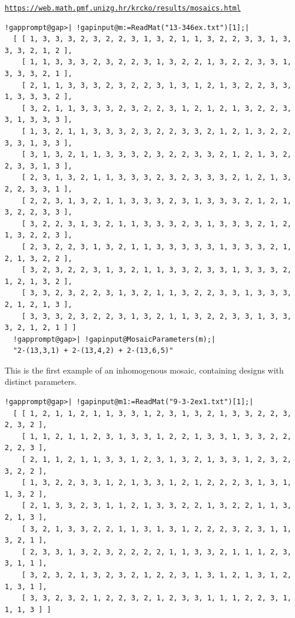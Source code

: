 \documentclass[a4paper,11pt]{report}
\begin{document}
{{ \href{https://web.math.pmf.unizg.hr/~krcko/results/mosaics.html} {\texttt{https://web.math.pmf.unizg.hr/\texttt{}krcko/results/mosaics.html}} 
\begin{Verbatim}[commandchars=!@|,fontsize=\small,frame=single,label=Example]
  !gapprompt@gap>| !gapinput@m:=ReadMat("13-346ex.txt")[1];|
  [ [ 1, 3, 3, 3, 2, 3, 2, 2, 3, 1, 3, 2, 1, 1, 3, 2, 2, 3, 3, 1, 3, 3, 3, 2, 1, 2 ], 
    [ 1, 1, 3, 3, 3, 2, 3, 2, 2, 3, 1, 3, 2, 2, 1, 3, 2, 2, 3, 3, 1, 3, 3, 3, 2, 1 ], 
    [ 2, 1, 1, 3, 3, 3, 2, 3, 2, 2, 3, 1, 3, 1, 2, 1, 3, 2, 2, 3, 3, 1, 3, 3, 3, 2 ], 
    [ 3, 2, 1, 1, 3, 3, 3, 2, 3, 2, 2, 3, 1, 2, 1, 2, 1, 3, 2, 2, 3, 3, 1, 3, 3, 3 ], 
    [ 1, 3, 2, 1, 1, 3, 3, 3, 2, 3, 2, 2, 3, 3, 2, 1, 2, 1, 3, 2, 2, 3, 3, 1, 3, 3 ], 
    [ 3, 1, 3, 2, 1, 1, 3, 3, 3, 2, 3, 2, 2, 3, 3, 2, 1, 2, 1, 3, 2, 2, 3, 3, 1, 3 ], 
    [ 2, 3, 1, 3, 2, 1, 1, 3, 3, 3, 2, 3, 2, 3, 3, 3, 2, 1, 2, 1, 3, 2, 2, 3, 3, 1 ], 
    [ 2, 2, 3, 1, 3, 2, 1, 1, 3, 3, 3, 2, 3, 1, 3, 3, 3, 2, 1, 2, 1, 3, 2, 2, 3, 3 ], 
    [ 3, 2, 2, 3, 1, 3, 2, 1, 1, 3, 3, 3, 2, 3, 1, 3, 3, 3, 2, 1, 2, 1, 3, 2, 2, 3 ], 
    [ 2, 3, 2, 2, 3, 1, 3, 2, 1, 1, 3, 3, 3, 3, 3, 1, 3, 3, 3, 2, 1, 2, 1, 3, 2, 2 ], 
    [ 3, 2, 3, 2, 2, 3, 1, 3, 2, 1, 1, 3, 3, 2, 3, 3, 1, 3, 3, 3, 2, 1, 2, 1, 3, 2 ], 
    [ 3, 3, 2, 3, 2, 2, 3, 1, 3, 2, 1, 1, 3, 2, 2, 3, 3, 1, 3, 3, 3, 2, 1, 2, 1, 3 ], 
    [ 3, 3, 3, 2, 3, 2, 2, 3, 1, 3, 2, 1, 1, 3, 2, 2, 3, 3, 1, 3, 3, 3, 2, 1, 2, 1 ] ]
  !gapprompt@gap>| !gapinput@MosaicParameters(m);|
  "2-(13,3,1) + 2-(13,4,2) + 2-(13,6,5)"
\end{Verbatim}
 This is the first example of an inhomogenous mosaic, containing designs with
distinct parameters. 
\begin{Verbatim}[commandchars=!@|,fontsize=\small,frame=single,label=Example]
  !gapprompt@gap>| !gapinput@m1:=ReadMat("9-3-2ex1.txt")[1];|
  [ [ 1, 2, 1, 1, 2, 1, 1, 3, 3, 1, 2, 3, 1, 3, 2, 1, 3, 3, 2, 2, 3, 2, 3, 2 ], 
    [ 1, 1, 2, 1, 1, 2, 3, 1, 3, 3, 1, 2, 2, 1, 3, 3, 1, 3, 3, 2, 2, 2, 2, 3 ], 
    [ 2, 1, 1, 2, 1, 1, 3, 3, 1, 2, 3, 1, 3, 2, 1, 3, 3, 1, 2, 3, 2, 3, 2, 2 ], 
    [ 1, 3, 2, 2, 3, 3, 1, 2, 1, 3, 3, 1, 2, 1, 2, 2, 2, 3, 1, 3, 1, 1, 3, 2 ], 
    [ 2, 1, 3, 3, 2, 3, 1, 1, 2, 1, 3, 3, 2, 2, 1, 3, 2, 2, 1, 1, 3, 2, 1, 3 ], 
    [ 3, 2, 1, 3, 3, 2, 2, 1, 1, 3, 1, 3, 1, 2, 2, 2, 3, 2, 3, 1, 1, 3, 2, 1 ], 
    [ 2, 3, 3, 1, 3, 2, 3, 2, 2, 2, 2, 1, 1, 3, 3, 2, 1, 1, 1, 2, 3, 3, 1, 1 ], 
    [ 3, 2, 3, 2, 1, 3, 2, 3, 2, 1, 2, 2, 3, 1, 3, 1, 2, 1, 3, 1, 2, 1, 3, 1 ], 
    [ 3, 3, 2, 3, 2, 1, 2, 2, 3, 2, 1, 2, 3, 3, 1, 1, 1, 2, 2, 3, 1, 1, 1, 3 ] ]

\end{Verbatim}}}
\end{document}
